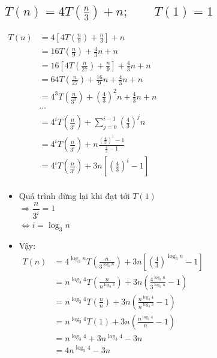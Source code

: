\documentclass[12pt, letterpaper]{article}
\begin{document}
\subsection{$ T(n) = 4T(\frac{n}{3}) + n; \quad \quad T(1) = 1 $}
$ \begin{aligned}
		T(n) & = 4[4T(\frac{n}{9}) + \frac{n}{3}] + n                                    \\
		     & = 16T(\frac{n}{9}) + \frac{4}{3}n + n                                     \\
		     & = 16[4T(\frac{n}{27}) + \frac{n}{9}] + \frac{4}{3}n + n                   \\
		     & = 64T(\frac{n}{27}) + \frac{16}{9}n + \frac{4}{3}n + n                    \\
		     & = 4^3T(\frac{n}{3^3}) + {(\frac{4}{3})}^2n + \frac{4}{3}n + n             \\
		     & \cdots                                                                    \\
		     & = 4^{i}T(\frac{n}{3^i}) + \sum_{j = 0}^{i - 1}{(\frac{4}{3})}^j n         \\
		     & = 4^{i}T(\frac{n}{3^i}) + n \frac{{(\frac{4}{3})}^i - 1}{\frac{4}{3} - 1} \\
		     & = 4^{i}T(\frac{n}{3^i}) + 3n[{(\frac{4}{3})}^i - 1]                       \\
	\end{aligned} $

\begin{itemize}[label=-]
	\item Quá trình dừng lại khi đạt tới $ T(1) $ \\
	      $ \Rightarrow \dfrac{n}{3^i} = 1 $ \\
	      $ \Leftrightarrow i = \log_3n $
	\item Vậy:\\
	      $ \begin{aligned}
			      T(n) & = 4^{\log_3n} T(\frac{n}{3^{\log_3n}}) + 3n[{(\frac{4}{3})}^{\log_3n} - 1]           \\
			           & = n^{\log_3 4} T(\frac{n}{n^{\log_3 3}}) + 3n(\frac{4^{\log_3 n}}{3^{\log_3 n}} - 1) \\
			           & = n^{\log_3 4} T(\frac{n}{n}) + 3n(\frac{n^{\log_3 4}}{n^{\log_3 3}} - 1)            \\
			           & = n^{\log_3 4} T(1) + 3n(\frac{n^{\log_3 4}}{n} - 1)                                 \\
			           & = n^{\log_3 4} + 3n^{\log_3 4} - 3n                                                  \\
			           & = 4n^{\log_3 4} - 3n                                                                 \\
		      \end{aligned} $
\end{itemize}
\end{document}
